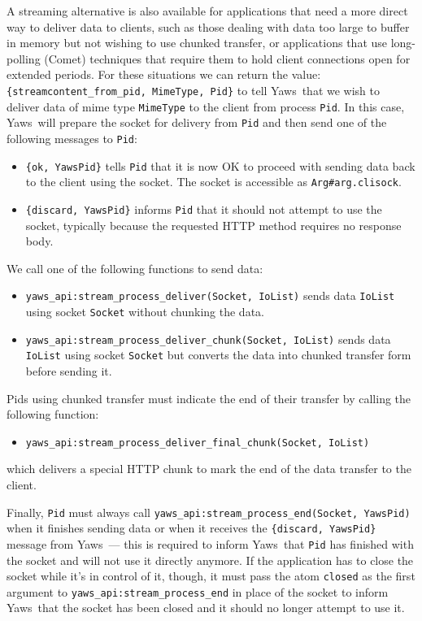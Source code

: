 \documentclass[11pt,oneside,english]{book}
\newcommand{\Yaws}            %
        {{\sc Yaws}}
\begin{document}
A streaming alternative is also available for applications that need a
more direct way to deliver data to clients, such as those dealing with
data too large to buffer in memory but not wishing to use chunked
transfer, or applications that use long-polling (Comet) techniques
that require them to hold client connections open for extended
periods. For these situations we can return the value:
\verb+{streamcontent_from_pid, MimeType, Pid}+ to tell \Yaws\ that we
wish to deliver data of mime type \verb+MimeType+ to the client from
process \verb+Pid+. In this case, \Yaws\ will prepare the socket for
delivery from \verb+Pid+ and then send one of the following messages
to \verb+Pid+:
\begin{itemize}
\item \verb+{ok, YawsPid}+ tells \verb+Pid+ that it is now OK to
  proceed with sending data back to the client using the socket. The
  socket is accessible as \verb+Arg#arg.clisock+.

\item \verb+{discard, YawsPid}+ informs \verb+Pid+ that it should not
  attempt to use the socket, typically because the requested HTTP
  method requires no response body.
\end{itemize}

We call one of the following functions to send data:
\begin{itemize}
\item \verb+yaws_api:stream_process_deliver(Socket, IoList)+ sends
  data \verb+IoList+ using socket \verb+Socket+ without chunking the
  data.

\item \verb+yaws_api:stream_process_deliver_chunk(Socket, IoList)+
  sends data \verb+IoList+ using socket \verb+Socket+ but converts
  the data into chunked transfer form before sending it.
\end{itemize}

Pids using chunked transfer must indicate the end of their transfer by
calling the following function:
\begin{itemize}
\item \verb+yaws_api:stream_process_deliver_final_chunk(Socket, IoList)+
\end{itemize}

which delivers a special HTTP chunk to mark the end of the data
transfer to the client.

Finally, \verb+Pid+ must always call
\verb+yaws_api:stream_process_end(Socket, YawsPid)+ when it finishes
sending data or when it receives the \verb+{discard, YawsPid}+ message
from \Yaws\ --- this is required to inform \Yaws\ that \verb+Pid+ has
finished with the socket and will not use it directly anymore. If the
application has to close the socket while it's in control of it,
though, it must pass the atom \verb+closed+ as the first argument to
\verb+yaws_api:stream_process_end+ in place of the socket to inform
\Yaws\ that the socket has been closed and it should no longer attempt
to use it.
\end{document}

